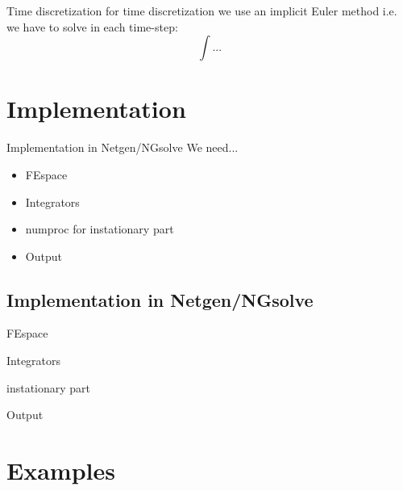 \documentclass[11pt]{beamer}
\theoremstyle{plain}
\theoremstyle{definition}
\theoremstyle{remark}
\begin{document}
\begin{frame}{Time discretization}
	for time discretization we use an implicit Euler method i.e. we have to solve in each time-step:
	\begin{equation}
		\int...
	\end{equation}
\end{frame}


\section{Implementation}
\begin{frame}{Implementation in Netgen/NGsolve}
	We need...
	\begin{itemize}[<+->]
		\item{FEspace}
		\item{Integrators}
		\item{numproc for instationary part}
		\item{Output}	
	\end{itemize}
\end{frame}
\subsection{Implementation in Netgen/NGsolve}
\begin{frame}{FEspace}

\end{frame}

\begin{frame}{Integrators}

\end{frame}

\begin{frame}{instationary part}

\end{frame}

\begin{frame}{Output}

\end{frame}


\section{Examples}
\begin{frame}

\end{frame}
\end{document}
